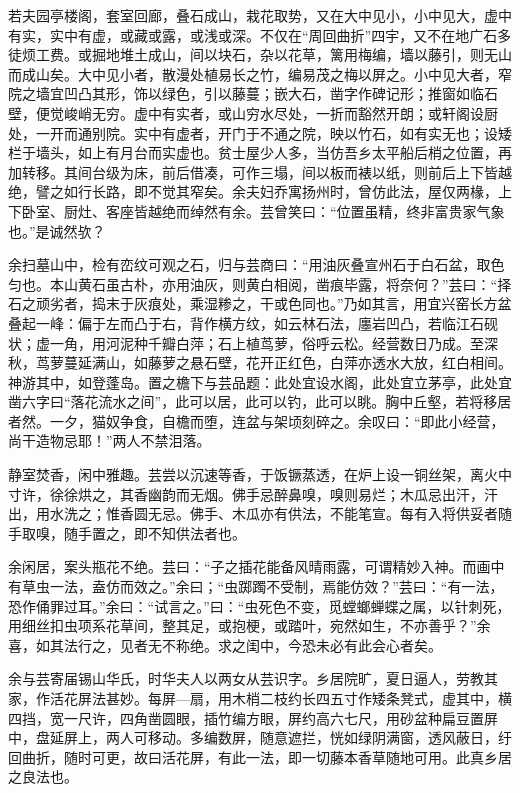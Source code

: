 \documentclass[]{article}
\begin{document}
若夫园亭楼阁，套室回廊，叠石成山，栽花取势，又在大中见小，小中见大，虚中有实，实中有虚，或藏或露，或浅或深。不仅在``周回曲折''四宇，又不在地广石多徒烦工费。或掘地堆土成山，间以块石，杂以花草，篱用梅编，墙以藤引，则无山而成山矣。大中见小者，散漫处植易长之竹，编易茂之梅以屏之。小中见大者，窄院之墙宜凹凸其形，饰以绿色，引以藤蔓；嵌大石，凿字作碑记形；推窗如临石壁，便觉峻峭无穷。虚中有实者，或山穷水尽处，一折而豁然开朗；或轩阁设厨处，一开而通别院。实中有虚者，开门于不通之院，映以竹石，如有实无也；设矮栏于墙头，如上有月台而实虚也。贫士屋少人多，当仿吾乡太平船后梢之位置，再加转移。其间台级为床，前后借凑，可作三塌，间以板而裱以纸，则前后上下皆越绝，譬之如行长路，即不觉其窄矣。余夫妇乔寓扬州时，曾仿此法，屋仅两椽，上下卧室、厨灶、客座皆越绝而绰然有余。芸曾笑曰：``位置虽精，终非富贵家气象也。''是诚然欤？

余扫墓山中，检有峦纹可观之石，归与芸商曰：``用油灰叠宣州石于白石盆，取色匀也。本山黄石虽古朴，亦用油灰，则黄白相阅，凿痕毕露，将奈何？''芸曰：``择石之顽劣者，捣末于灰痕处，乘湿糁之，干或色同也。''乃如其言，用宜兴窑长方盆叠起一峰：偏于左而凸于右，背作横方纹，如云林石法，廛岩凹凸，若临江石砚状；虚一角，用河泥种千瓣白萍；石上植茑萝，俗呼云松。经营数日乃成。至深秋，茑萝蔓延满山，如藤萝之悬石壁，花开正红色，白萍亦透水大放，红白相间。神游其中，如登蓬岛。置之檐下与芸品题：此处宜设水阁，此处宜立茅亭，此处宜凿六字曰``落花流水之间''，此可以居，此可以钓，此可以眺。胸中丘壑，若将移居者然。一夕，猫奴争食，自檐而堕，连盆与架顷刻碎之。余叹曰：``即此小经营，尚干造物忌耶！''两人不禁泪落。

静室焚香，闲中雅趣。芸尝以沉速等香，于饭镢蒸透，在炉上设一铜丝架，离火中寸许，徐徐烘之，其香幽韵而无烟。佛手忌醉鼻嗅，嗅则易烂；木瓜忌出汗，汗出，用水洗之；惟香圆无忌。佛手、木瓜亦有供法，不能笔宣。每有入将供妥者随手取嗅，随手置之，即不知供法者也。

余闲居，案头瓶花不绝。芸曰：``子之插花能备风晴雨露，可谓精妙入神。而画中有草虫一法，盍仿而效之。''余曰；``虫踯躅不受制，焉能仿效？''芸曰：``有一法，恐作俑罪过耳。''余曰：``试言之。''曰：``虫死色不变，觅螳螂蝉蝶之属，以针刺死，用细丝扣虫项系花草间，整其足，或抱梗，或踏叶，宛然如生，不亦善乎？''余喜，如其法行之，见者无不称绝。求之闺中，今恐未必有此会心者矣。

余与芸寄届锡山华氏，时华夫人以两女从芸识字。乡居院旷，夏日逼人，劳教其家，作活花屏法甚妙。每屏---扇，用木梢二枝约长四五寸作矮条凳式，虚其中，横四挡，宽一尺许，四角凿圆眼，插竹编方眼，屏约高六七尺，用砂盆种扁豆置屏中，盘延屏上，两人可移动。多编数屏，随意遮拦，恍如绿阴满窗，透风蔽日，纡回曲折，随时可更，故曰活花屏，有此一法，即一切藤本香草随地可用。此真乡居之良法也。
\end{document}
